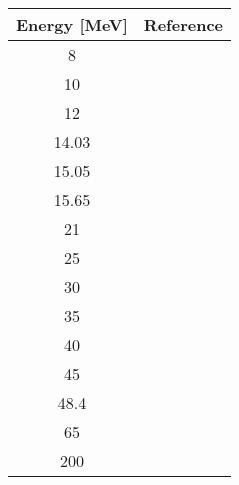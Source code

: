 \begin{tabular}{c c} 
    \toprule 
    \bf{Energy [MeV]} & \bf{Reference} \\
    \midrule
    8 & \cite{Liers71}\\
    10 & \cite{Liers71}\\
    12 & \cite{Liers71}\\
    14.03 & \cite{Lombardi72}\\
    15.05 & \cite{Lombardi72}\\
    15.65 & \cite{Lombardi72}\\
    21 & \cite{Mccamis86}\\
    25 & \cite{Mccamis86}\\
    30 & \cite{Mccamis86}\\
    35 & \cite{Mccamis86}\\
    40 & \cite{Mccamis86}\\
    45 & \cite{Mccamis86}\\
    48.4 & \cite{Mccamis86}\\
    65 & \cite{Noro81}\\
    200 & \cite{Murdock87}\\
    \bottomrule
\end{tabular}
